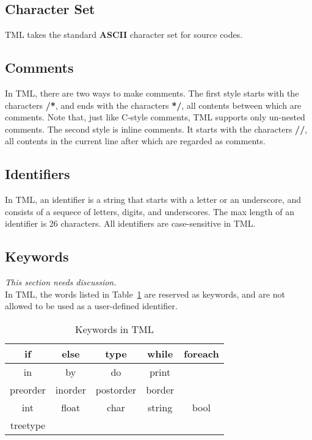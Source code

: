 \documentclass[12pt,psfig,a4]{article}
\begin{document}
\subsection{Character Set}
TML takes the standard \textbf{ASCII} character set for source codes.

\subsection{Comments}
In TML, there are two ways to make comments. The first style starts with the characters \textbf{/*}, and ends with the characters \textbf{*/}, all contents between which are comments. Note that, just like C-style comments, TML supports only un-nested comments. The second style is inline comments. It starts with the characters \textbf{//}, all contents in the current line after which are regarded as comments.

\subsection{Identifiers} \label{lexConId}
In TML, an identifier is a string that starts with a letter or an underscore, and consists of a sequece of letters, digits, and underscores. The max length of an identifier is 26 characters. 
All identifiers are case-sensitive in TML.

\subsection{Keywords}
\textit{This section needs discussion.}\\
In TML, the words listed in Table~\ref{keywords} are reserved as keywords, and are not allowed to be used as a user-defined identifier.

\begin{table}[ht]
\begin{center}
\begin{tabular}{| c | c | c | c | c |}
\hline
if & else & type & while & foreach \\
\hline
in & by & do & print &\\
\hline
preorder & inorder & postorder & border &\\
\hline
int & float & char & string & bool  \\
\hline
treetype &  & & & \\
\hline
\end{tabular}
\caption{Keywords in TML}
\label{keywords}
\end {center}
\end{table}
\end{document}
